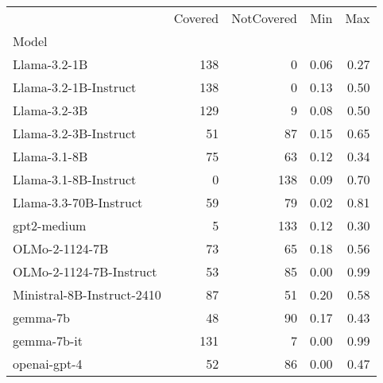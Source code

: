 \begin{tabular}{lrrrr}
\toprule
 & Covered & NotCovered & Min & Max \\
Model &  &  &  &  \\
\midrule
Llama-3.2-1B & 138 & 0 & 0.06 & 0.27 \\
Llama-3.2-1B-Instruct & 138 & 0 & 0.13 & 0.50 \\
Llama-3.2-3B & 129 & 9 & 0.08 & 0.50 \\
Llama-3.2-3B-Instruct & 51 & 87 & 0.15 & 0.65 \\
Llama-3.1-8B & 75 & 63 & 0.12 & 0.34 \\
Llama-3.1-8B-Instruct & 0 & 138 & 0.09 & 0.70 \\
Llama-3.3-70B-Instruct & 59 & 79 & 0.02 & 0.81 \\
gpt2-medium & 5 & 133 & 0.12 & 0.30 \\
OLMo-2-1124-7B & 73 & 65 & 0.18 & 0.56 \\
OLMo-2-1124-7B-Instruct & 53 & 85 & 0.00 & 0.99 \\
Ministral-8B-Instruct-2410 & 87 & 51 & 0.20 & 0.58 \\
gemma-7b & 48 & 90 & 0.17 & 0.43 \\
gemma-7b-it & 131 & 7 & 0.00 & 0.99 \\
openai-gpt-4 & 52 & 86 & 0.00 & 0.47 \\
\bottomrule
\end{tabular}

